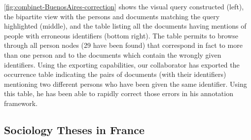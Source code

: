 \autoref{fig:combinet-BuenosAires-correction} shows the visual query constructed (left), the bipartite view with the persons and documents matching the query highlighted (middle), and the table listing all the documents having mentions of people with erroneous identifiers (bottom right).
The table permits to browse through all person nodes (29 have been found) that correspond in fact to more than one person and to the documents which contain the wrongly given identifiers.
Using the exporting capabilities, our collaborator has exported the occurrence table indicating the pairs of documents (with their identifiers) mentioning two different persons who have been given the same identifier.
Using this table, he has been able to rapidly correct those errors in his annotation framework.








\subsection{Sociology Theses in France}

